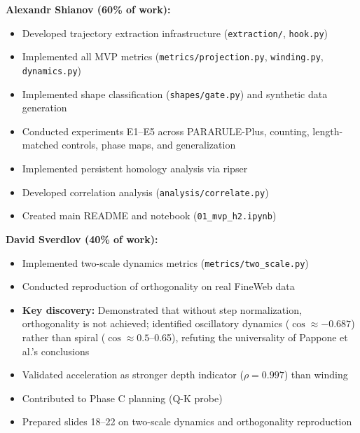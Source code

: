 \textbf{Alexandr Shianov (60\% of work):}
\begin{itemize}
    \item Developed trajectory extraction infrastructure (\texttt{extraction/}, \texttt{hook.py})
    \item Implemented all MVP metrics (\texttt{metrics/projection.py}, \texttt{winding.py}, \texttt{dynamics.py})
    \item Implemented shape classification (\texttt{shapes/gate.py}) and synthetic data generation
    \item Conducted experiments E1--E5 across PARARULE-Plus, counting, length-matched controls, phase maps, and generalization
    \item Implemented persistent homology analysis via ripser
    \item Developed correlation analysis (\texttt{analysis/correlate.py})
    \item Created main README and notebook (\texttt{01\_mvp\_h2.ipynb})
\end{itemize}

\textbf{David Sverdlov (40\% of work):}
\begin{itemize}
    \item Implemented two-scale dynamics metrics (\texttt{metrics/two\_scale.py})
    \item Conducted reproduction of orthogonality on real FineWeb data
    \item \textbf{Key discovery:} Demonstrated that without step normalization, orthogonality is not achieved; identified oscillatory dynamics ($\cos \approx -0.687$) rather than spiral ($\cos \approx 0.5$--0.65), refuting the universality of Pappone et al.'s conclusions
    \item Validated acceleration as stronger depth indicator ($\rho = 0.997$) than winding
    \item Contributed to Phase C planning (Q-K probe)
    \item Prepared slides 18--22 on two-scale dynamics and orthogonality reproduction
\end{itemize}


